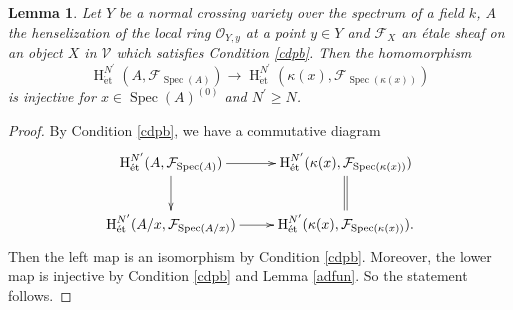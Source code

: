 \documentclass{article}
\newtheorem{lem}[thm]{\indent \sc Lemma}
\newcommand{\spec}{\operatorname{Spec}}
\newcommand{\et}{\mathrm{\acute{e}t}}
\newcommand{\HO}{\operatorname{H}}
\begin{document}
%
%
\begin{lem}\upshape\label{heninj}
Let $Y$ be a normal crossing variety over the spectrum of a field $k$, 
$A$ the henselization of the local ring $\mathcal{O}_{Y, y}$
at a point $y\in Y$
and
$\mathcal{F}_{X}$
an \'{e}tale sheaf on an object $X$ in $\mathcal{V}$
which satisfies Condition \ref{cdpb}.
Then the homomorphism
%
\begin{equation*}
\HO^{N^{\prime}}_{\et}(
A, 
\mathcal{F}_{\spec(A)}
)    
\to
\HO^{N^{\prime}}_{\et}(
\kappa(x), 
\mathcal{F}_{\spec(\kappa(x))}
)   
\end{equation*}
%
is injective for
$x\in \spec(A)^{(0)}$
and
$N^{\prime}\geq N$.
\end{lem}
%

%
\begin{proof}\upshape
By Condition \ref{cdpb},
we have a commutative diagram
%
\begin{equation*}
\xymatrix{
\HO^{N^{\prime}}_{\et}(A,
\mathcal{F}_{\spec(A)})
\ar[r]
\ar[d]
&
\HO^{N^{\prime}}_{\et}(
\kappa(x),
\mathcal{F}_{\spec(\kappa(x))}
)
\ar@{=}[d]
\\
\HO^{N^{\prime}}_{\et}(
A/x,
\mathcal{F}_{\spec(A/x)}
)
\ar[r]
&
\HO^{N^{\prime}}_{\et}(
\kappa(x),
\mathcal{F}_{\spec(\kappa(x))}
).
}    
\end{equation*}
%
Then the left map is an isomorphism by Condition \ref{cdpb}. Moreover, 
the lower map is injective by Condition \ref{cdpb} and Lemma \ref{adfun}. So the statement follows.
\end{proof}
%
\end{document}
